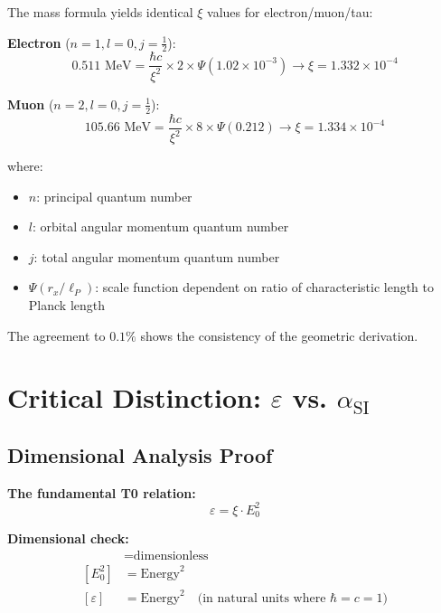 \documentclass[12pt,a4paper]{article}
\numberwithin{equation}{section}
\newcommand{\xipar}{\xi}
\newcommand{\epsilonT}{\varepsilon}
\newcommand{\alphaSI}{\alpha_{\text{SI}}}
\newcommand{\Eo}{E_0}
\begin{document}
	The mass formula yields identical $\xipar$ values for electron/muon/tau:
	
	\textbf{Electron} ($n=1, l=0, j=\frac{1}{2}$):
	\begin{equation}
		0.511 \text{ MeV} = \frac{\hbar c}{\xipar^2} \times 2 \times \Psi(1.02 \times 10^{-3}) \rightarrow \xipar = 1.332 \times 10^{-4}
		\label{eq:xi_electron}
	\end{equation}
	
	\textbf{Muon} ($n=2, l=0, j=\frac{1}{2}$):
	\begin{equation}
		105.66 \text{ MeV} = \frac{\hbar c}{\xipar^2} \times 8 \times \Psi(0.212) \rightarrow \xipar = 1.334 \times 10^{-4}
		\label{eq:xi_muon}
	\end{equation}
	
	where:
	\begin{itemize}
		\item $n$: principal quantum number
		\item $l$: orbital angular momentum quantum number
		\item $j$: total angular momentum quantum number
		\item $\Psi(r_x/\ell_P)$: scale function dependent on ratio of characteristic length to Planck length
	\end{itemize}
	
	The agreement to $0.1\%$ shows the consistency of the geometric derivation.
	
	\section{Critical Distinction: $\epsilonT$ vs. $\alphaSI$}
	

	
	\subsection{Dimensional Analysis Proof}
	
	\textbf{The fundamental T0 relation:}
	\begin{equation}
		\epsilonT = \xipar \cdot \Eo^2
		\label{eq:epsilon_fundamental}
	\end{equation}
	
	\textbf{Dimensional check:}
	\begin{align}
		[\xipar] &= \text{dimensionless} \\
		[\Eo^2] &= \text{Energy}^2 \\
		[\epsilonT] &= \text{Energy}^2 \quad \text{(in natural units where } \hbar = c = 1\text{)}
		\label{eq:dimensions}
	\end{align}
	
\end{document}
